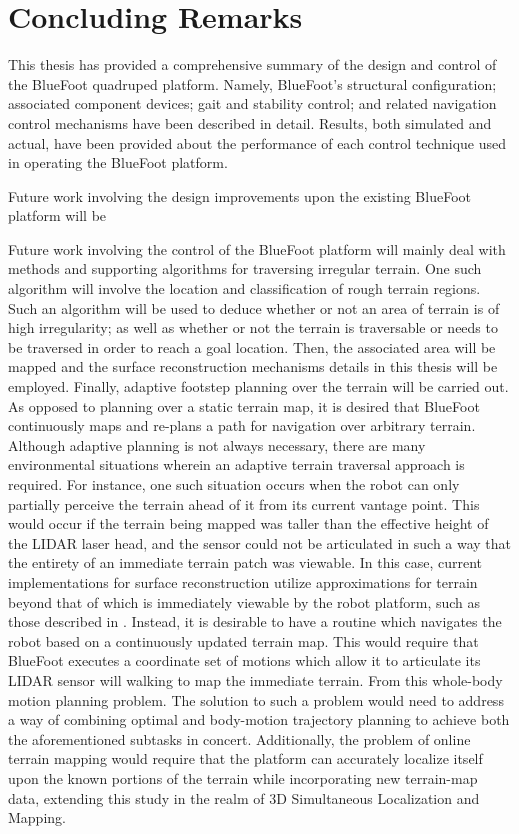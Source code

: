 \chapter{Concluding Remarks}

This thesis has provided a comprehensive summary of the design and control of the BlueFoot quadruped platform. Namely, BlueFoot's structural configuration; associated component devices; gait and stability control; and related navigation control mechanisms have been described in detail. Results, both simulated and actual, have been provided about the performance of each control technique used in operating the BlueFoot platform.

Future work involving the design improvements upon the existing BlueFoot platform will be 

Future work involving the control of the BlueFoot platform will mainly deal with methods and supporting algorithms for traversing irregular terrain.  One such algorithm will involve the location and classification of rough terrain regions. Such an algorithm will be used to deduce whether or not an area of terrain is of high irregularity; as well as whether or not the terrain is traversable or needs to be traversed in order to reach a goal location. Then, the associated area will be mapped and the surface reconstruction mechanisms details in this thesis will be employed. Finally, adaptive footstep planning over the terrain will be carried out. As opposed to planning over a static terrain map, it is desired that BlueFoot continuously maps and re-plans a path for navigation over arbitrary terrain. Although adaptive planning is not always necessary, there are many environmental situations wherein an adaptive terrain traversal approach is required. For instance, one such situation occurs when the robot can only partially perceive the terrain ahead of it from its current vantage point. This would occur if the terrain being mapped was taller than the effective height of the LIDAR laser head, and the sensor could not be articulated in such a way that the entirety of an immediate terrain patch was viewable. In this case, current implementations for surface reconstruction utilize approximations for terrain beyond that of which is immediately viewable by the robot platform, such as those described in \cite{other dudes}. Instead, it is desirable to have a routine which navigates the robot based on a continuously updated terrain map. This would require that BlueFoot executes a coordinate set of motions which allow it to articulate its LIDAR sensor will walking to map the immediate terrain. From this whole-body motion planning problem. The solution to such a problem would need to address a way of combining optimal and body-motion trajectory planning to achieve both the aforementioned subtasks in concert. Additionally, the problem of online terrain mapping would require that the platform can accurately localize itself upon the known portions of the terrain while incorporating new terrain-map data, extending this study in the realm of 3D Simultaneous Localization and Mapping.